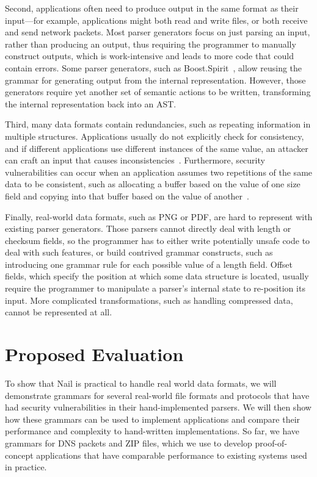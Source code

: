 \documentclass[a4paper]{article}
\begin{document}
Second,  applications often need to produce output in the same
format as their input---for example, applications might both
read and write files, or both receive and send network packets.
Most parser generators focus on just parsing an input, rather
than producing an output, thus requiring the programmer to manually
construct outputs, which is work-intensive and leads to
more code that could contain errors.
Some parser generators, such as
Boost.Spirit~\cite{boost-spirit},
allow reusing the grammar for generating output from the internal
representation.  However, those generators require yet another set of
semantic actions to be written, transforming the internal representation
back into an AST\@.

Third, many data formats contain redundancies, such as repeating
information in multiple structures.  Applications usually do not
explicitly check for consistency, and if different applications use
different instances of the same value, an attacker can craft an input that
causes inconsistencies~\cite{evaders6}.  Furthermore, security
vulnerabilities can occur when an application assumes two repetitions
of the same data to be consistent, such as allocating a buffer based on
the value of one size field and copying into that buffer based on the
value of another~\cite{python-bug:20078}.

Finally, real-world data formats, such as PNG or PDF, are hard to
represent with existing parser generators.  Those parsers cannot directly
deal with length or checksum fields, so the programmer has to
either write potentially unsafe code to deal with such features, or build
contrived grammar constructs, such as introducing one grammar rule for
each possible value of a length field.  Offset fields, which specify
the position at which some data structure is located, usually require
the programmer to manipulate a parser's internal state to re-position
its input.  More complicated transformations, such as handling compressed
data, cannot be represented at all.

\section{Proposed Evaluation}
To show that Nail is practical to handle real world data formats, we
will demonstrate grammars for several real-world file formats and
protocols that have had security vulnerabilities in their
hand-implemented parsers. We will then show how these grammars can be
used to implement applications and compare their performance and
complexity to hand-written implementations. So far, we have grammars
for DNS packets and ZIP files, which we use to develop
proof-of-concept applications that have comparable performance to
existing systems used in practice.
\end{document}
